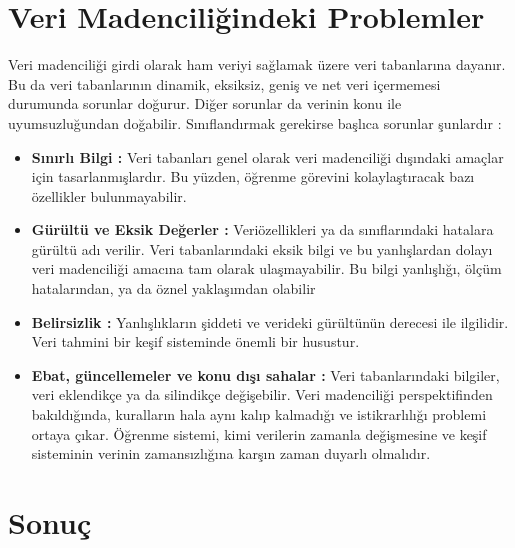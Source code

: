 \documentclass{article}
\begin{document}
\section{Veri Madenciliğindeki Problemler}
\vspace{10pt}
Veri madenciliği girdi olarak ham veriyi sağlamak üzere veri tabanlarına
dayanır. Bu da veri tabanlarının dinamik, eksiksiz, geniş ve net veri içermemesi
durumunda sorunlar doğurur. Diğer sorunlar da verinin konu ile uyumsuzluğundan
doğabilir.
Sınıflandırmak gerekirse başlıca sorunlar şunlardır :
\vspace{10pt}
\begin{itemize}
    
    \item \textbf{Sınırlı Bilgi : }Veri tabanları genel olarak veri madenciliği dışındaki
amaçlar için tasarlanmışlardır. Bu yüzden, öğrenme görevini
kolaylaştıracak bazı özellikler bulunmayabilir.
    \item \textbf{Gürültü ve Eksik Değerler : }Veriözellikleri ya da sınıflarındaki
hatalara gürültü adı verilir. Veri tabanlarındaki eksik bilgi ve bu yanlışlardan dolayı veri madenciliği amacına tam olarak ulaşmayabilir. Bu bilgi yanlışlığı, ölçüm hatalarından, ya da öznel yaklaşımdan
olabilir
    \item \textbf{Belirsizlik : }Yanlışlıkların şiddeti ve verideki gürültünün derecesi ile
ilgilidir. Veri tahmini bir keşif sisteminde önemli bir husustur. 
    \item \textbf{Ebat, güncellemeler ve konu dışı sahalar :} Veri tabanlarındaki bilgiler,
veri eklendikçe ya da silindikçe değişebilir. Veri madenciliği
perspektifinden bakıldığında, kuralların hala aynı kalıp kalmadığı ve
istikrarlılığı problemi ortaya çıkar. Öğrenme sistemi, kimi verilerin
zamanla değişmesine ve keşif sisteminin verinin zamansızlığına karşın
zaman duyarlı olmalıdır. 
\end{itemize}

\vspace{10pt}
\section{Sonuç}
\end{document}
